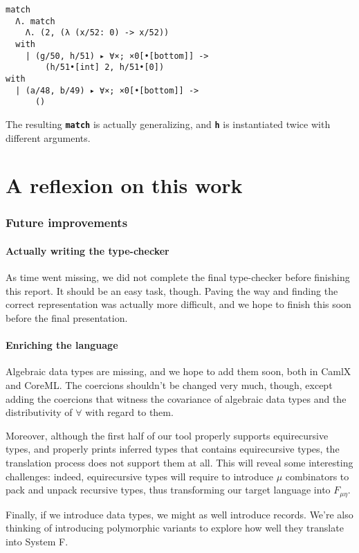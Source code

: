 \documentclass[10pt,a4paper,twoside,titlepage,twocolumn]{article}
\newcommand{\code}[1]{\textbf{\texttt{#1}}}
\begin{document}
\begin{verbatim}
match
  Λ. match
    Λ. (2, (λ (x/52: 0) -> x/52))
  with
    | (g/50, h/51) ▸ ∀×; ×0[•[bottom]] ->
        (h/51•[int] 2, h/51•[0])
with
  | (a/48, b/49) ▸ ∀×; ×0[•[bottom]] ->
      ()
\end{verbatim}

The resulting \code{match} is actually generalizing, and \code{h} is
instantiated twice with different arguments.

\part{A reflexion on this work}

\section{Future improvements}

\subsection{Actually writing the type-checker}

As time went missing, we did not complete the final type-checker before
finishing this report. It should be an easy task, though. Paving the way and
finding the correct representation was actually more difficult, and we hope to
finish this soon before the final presentation.

\subsection{Enriching the language}

Algebraic data types are missing, and we hope to add them soon, both in CamlX
and CoreML. The coercions shouldn't be changed very much, though, except adding
the coercions that witness the covariance of algebraic data types and the
distributivity of $\forall$ with regard to them.

Moreover, although the first half of our tool properly supports equirecursive
types, and properly prints inferred types that contains equirecursive types, the
translation process does not support them at all.  This will reveal some
interesting challenges: indeed, equirecursive types will require to introduce
$\mu$ combinators to pack and unpack recursive types, thus transforming our
target language into $F_{\mu\eta}$.

Finally, if we introduce data types, we might as well introduce records. We're
also thinking of introducing polymorphic variants to explore how well they
translate into System F.
\end{document}

